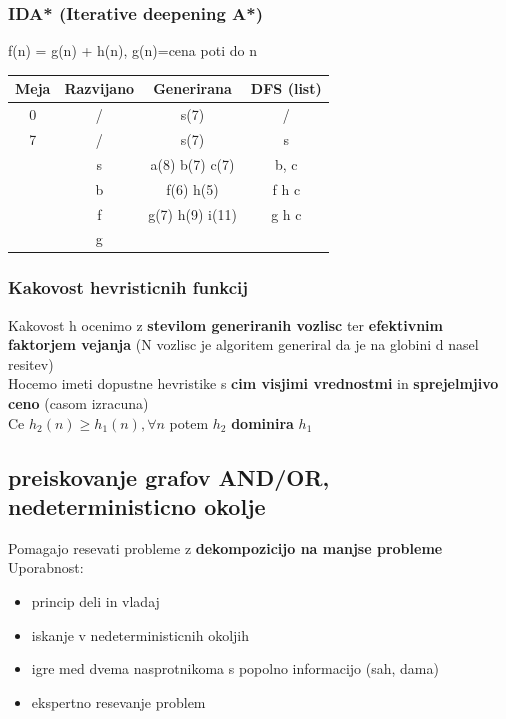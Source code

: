\subsubsection{IDA* (Iterative deepening A*)}
f(n) = g(n) + h(n), g(n)=cena poti do n\\
\begin{tabular}{c|c|c|c}
    Meja & Razvijano & Generirana & DFS (list)\\
    \hline
    0 & / & s(7) & /\\
    \hline
    7 & / & s(7) & s \\
      & s & a(8) b(7) c(7) & b, c\\
      & b & f(6) h(5) & f h c\\
      & f & g(7) h(9) i(11) & g h c\\
      & \underline{g} &  & 
\end{tabular}

\subsubsection{Kakovost hevristicnih funkcij}
Kakovost h ocenimo z \textbf{stevilom generiranih vozlisc} ter \textbf{efektivnim faktorjem vejanja} (N vozlisc je algoritem generiral da je na globini d nasel resitev)\\
Hocemo imeti dopustne hevristike s \textbf{cim visjimi vrednostmi} in \textbf{sprejelmjivo ceno} (casom izracuna)\\
Ce $h_2(n) \geq h_1(n), \forall n$ potem $h_2$ \textbf{dominira} $h_1$

\subsection{preiskovanje grafov AND/OR, nedeterministicno okolje}
Pomagajo resevati probleme z \textbf{dekompozicijo na manjse probleme}
Uporabnost:
\begin{itemize}[noitemsep,topsep=0pt,leftmargin=*]
    \item princip deli in vladaj
    \item iskanje v nedeterministicnih okoljih 
    \item igre med dvema nasprotnikoma s popolno informacijo (sah, dama)
    \item ekspertno resevanje problem
\end{itemize}
